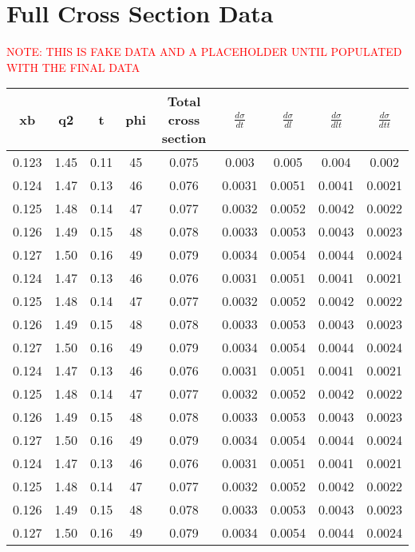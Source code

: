 \chapter{Full Cross Section Data}
\textcolor{red}{NOTE: THIS IS FAKE DATA AND A PLACEHOLDER UNTIL POPULATED WITH THE FINAL DATA}
    \begin{longtable}{|c|c|c|c|c|c|c|c|c|}
    \hline
    \textbf{xb} & \textbf{q2} & \textbf{t} & \textbf{phi} & \textbf{Total cross section} & $\frac{d\sigma}{dt}$ & $\frac{d\sigma}{dl}$ & $\frac{d\sigma}{dlt}$ & $\frac{d\sigma}{dtt}$ \\
    \hline
    \endhead
    0.123 & 1.45 & 0.11 & 45 & 0.075 & 0.003 & 0.005 & 0.004 & 0.002 \\
    0.124 & 1.47 & 0.13 & 46 & 0.076 & 0.0031 & 0.0051 & 0.0041 & 0.0021 \\
    0.125 & 1.48 & 0.14 & 47 & 0.077 & 0.0032 & 0.0052 & 0.0042 & 0.0022 \\
    0.126 & 1.49 & 0.15 & 48 & 0.078 & 0.0033 & 0.0053 & 0.0043 & 0.0023 \\
    0.127 & 1.50 & 0.16 & 49 & 0.079 & 0.0034 & 0.0054 & 0.0044 & 0.0024 \\
        0.124 & 1.47 & 0.13 & 46 & 0.076 & 0.0031 & 0.0051 & 0.0041 & 0.0021 \\
    0.125 & 1.48 & 0.14 & 47 & 0.077 & 0.0032 & 0.0052 & 0.0042 & 0.0022 \\
    0.126 & 1.49 & 0.15 & 48 & 0.078 & 0.0033 & 0.0053 & 0.0043 & 0.0023 \\
    0.127 & 1.50 & 0.16 & 49 & 0.079 & 0.0034 & 0.0054 & 0.0044 & 0.0024 \\
        0.124 & 1.47 & 0.13 & 46 & 0.076 & 0.0031 & 0.0051 & 0.0041 & 0.0021 \\
    0.125 & 1.48 & 0.14 & 47 & 0.077 & 0.0032 & 0.0052 & 0.0042 & 0.0022 \\
    0.126 & 1.49 & 0.15 & 48 & 0.078 & 0.0033 & 0.0053 & 0.0043 & 0.0023 \\
    0.127 & 1.50 & 0.16 & 49 & 0.079 & 0.0034 & 0.0054 & 0.0044 & 0.0024 \\
        0.124 & 1.47 & 0.13 & 46 & 0.076 & 0.0031 & 0.0051 & 0.0041 & 0.0021 \\
    0.125 & 1.48 & 0.14 & 47 & 0.077 & 0.0032 & 0.0052 & 0.0042 & 0.0022 \\
    0.126 & 1.49 & 0.15 & 48 & 0.078 & 0.0033 & 0.0053 & 0.0043 & 0.0023 \\
    0.127 & 1.50 & 0.16 & 49 & 0.079 & 0.0034 & 0.0054 & 0.0044 & 0.0024 \\

\end{longtable}
